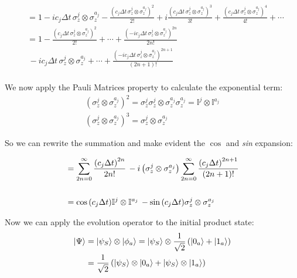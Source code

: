 \documentclass[a4paper,12pt]{article}
\begin{document}
	\begin{align*}
		&= 1 - i c_j \Delta t \, \sigma_{z}^{j} \otimes \sigma_{z}^{a_j} - \frac{\left( c_j \Delta t \, \sigma_{z}^{j} \otimes \sigma_{z}^{a_j} \right)^2}{2!} + i \frac{\left( c_j \Delta t \, \sigma_{z}^{j} \otimes \sigma_{z}^{a_j} \right)^3}{3!} + \frac{\left( c_j \Delta t \, \sigma_{z}^{j} \otimes \sigma_{z}^{a_j} \right)^4}{4!} + \cdots  \\
		&=1 - \frac{\left( c_j \Delta t \, \sigma_{z}^{j} \otimes \sigma_{z}^{a_j} \right)^2}{2!} + \cdots  + \frac{\left( -i c_j \Delta t \, \sigma_{z}^{j} \otimes \sigma_{z}^{a_j} \right)^{{2n}}}{2n!}  \\
		&\,- i c_j\Delta t \, \sigma_{z}^{j} \otimes \sigma_{z}^{a_j} + \cdots  + \frac{\left( -i c_j \Delta t \, \sigma_{z}^{j} \otimes \sigma_{z}^{a_j} \right)^{{2n+1}}}{(2n+1)!} \\
	\end{align*}

	We now apply the Pauli Matrices property to calculate the exponential term:
	\begin{gather*}
		\left(\sigma_{z}^{j} \otimes \sigma_{z}^{a_j} \right)^{2} = \sigma_{z}^{j} \sigma_{z}^{j} \otimes \sigma_{z}^{a_j} \sigma_{z}^{a_j} = \mathbb{I}^{j} \otimes \mathbb{I}^{a_j} \\
		\left(\sigma_{z}^{j} \otimes \sigma_{z}^{a_j} \right)^{3} = \sigma_{z}^{j} \otimes \sigma_{z}^{a_j}
	\end{gather*}

	\begin{flushleft}
		So we can rewrite the summation and make evident the $ \cos $ and \textit{sin} expansion:
	\end{flushleft}

	\begin{align}
		&=\sum_{2n=0}^{\infty}
		{ \frac{\left( c_j \Delta t \right)^{{2n}}}{2n!} } \, - i \left(\sigma_{z}^{j} \otimes \sigma_{z}^{a_j} \right) \sum_{2n=0}^{\infty}{ \frac{\left( c_j \Delta t  \right)^{{2n+1}}}{(2n+1)!} } \notag \\
		\notag \\
		&= \cos{\left(c_j \Delta t\right)} \mathbb{I}^{j} \otimes \mathbb{I}^{a_j} \, - \sin{\left(c_j \Delta t \right)} \sigma_{z}^{j} \otimes \sigma_{z}^{a_j}
		\label{eq_effective_U_form_cohe}
	\end{align}

	\newpage

	Now we can apply the evolution operator to the initial product state:
	\begin{align}
		\ket{\Psi}
		&= \ket{\psi_S} \otimes \ket{\phi_a}
		= \ket{\psi_S} \otimes \frac{1}{\sqrt{2}} \left( \ket{0_a} + \ket{1_a} \right) \notag \\
		&= \frac{1}{\sqrt{2}} \left(\ket{\psi_S} \otimes  \ket{0_a} + \ket{\psi_S} \otimes  \ket{1_a} \right)
		\label{eq:psi_initialization_cohe}
	\end{align}
\end{document}
